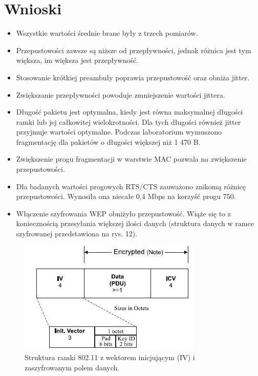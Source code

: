 \documentclass[12pt, a4paper, oneside]{article}
\begin{document}
\section{Wnioski}
\begin{itemize}
\item Wszystkie wartości średnie brane były z trzech pomiarów.
\item Przepustowości zawsze są niższe od przepływności, jednak różnica jest tym większa, im większa jest przepływność.
\item Stosowanie krótkiej preambuły poprawia przepustowość oraz obniża jitter.
\item Zwiększanie przepływności powoduje zmniejszenie wartości jittera.
\item Długość pakietu jest optymalna, kiedy jest równa maksymalnej długości ramki lub jej całkowitej wielokrotności. Dla tych długości również jitter przyjmuje wartości optymalne. Podczas laboratorium wymuszono fragmentację dla pakietów o długości większej niż 1 470 B.
\item Zwiększenie progu fragmentacji w warstwie MAC pozwala na zwiększenie przepustowości.
\item Dla badanych wartości progowych RTS/CTS zauważono znikomą różnicę przepustowości. Wynosiła ona niecałe 0,4 Mbps na korzyść progu 750.
\item Włączenie szyfrowania WEP obniżyło przepustowość. Wiąże się to z koniecznością przesyłania większej ilości danych (struktura danych w ramce szyfrowanej przedstawiona na rys. 12).
\end{itemize}
\clearpage
\begin{figure}[h]
\centering
\includegraphics[scale=0.9]{pics/f12.png}
\caption{Struktura ramki 802.11 z wektorem inicjującym (IV) i zaszyfrowanym polem danych.}
\end{figure}
\end{document}
